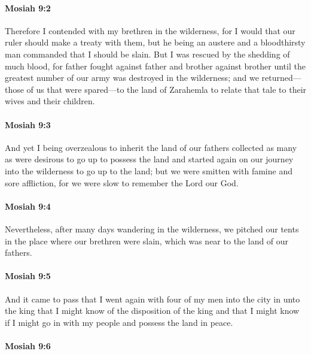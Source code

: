 		\paragraph{Mosiah 9:2} %
			\label{MOSIAH-9-2}

			Therefore I contended with my brethren in the wilderness,
			for I would that our ruler should make a treaty with them,
			but he being an austere and a bloodthirsty man commanded that I should be slain.
			But I was rescued by the shedding of much blood,
			for father fought against father and brother against brother
			until the greatest number of our army was destroyed in the wilderness;
			and we returned---those of us that were spared---to the land of Zarahemla
			to relate that tale to their wives and their children.

		\paragraph{Mosiah 9:3} %
			\label{MOSIAH-9-3}

			And yet I being overzealous to inherit the land of our fathers
			collected as many as were desirous to go up to possess the land
			and started again on our journey into the wilderness to go up to the land;
			but we were smitten with famine and sore affliction,
			for we were slow to remember the Lord our God.

		\paragraph{Mosiah 9:4} %
			\label{MOSIAH-9-4}

			Nevertheless, after many days wandering in the wilderness,
			we pitched our tents in the place where our brethren were slain,
			which was near to the land of our fathers.

		\paragraph{Mosiah 9:5} %
			\label{MOSIAH-9-5}

			And it came to pass that
			I went again with four of my men into the city in unto the king
			that I might know of the disposition of the king
			and that I might know if I might go in with my people
			and possess the land in peace.

		\paragraph{Mosiah 9:6} %
			\label{MOSIAH-9-6}

